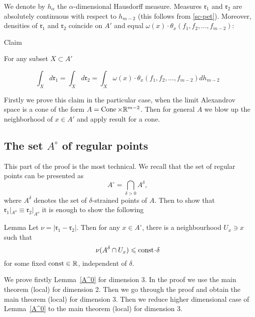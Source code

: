 We denote by $h_\alpha$ the $\alpha$-dimensional Hausdorff measure. Measures
$\mathfrak{r}_1$ and
$\mathfrak{r}_2$ are
 absolutely continuous with respect to
 $h_{m-2}$ (this follows from \ref{sc-pet}).
Moreover,
densities of
 $\mathfrak{r}_1$ and
$\mathfrak{r}_2$
coincide on $A'$ and equal 
$ \omega(x)\cdot\theta_x(f_1,f_2,\dots,f_{m-2})$:
\begin{thm}{Claim}\label{A'}
 
For any subset $X\subset A'$
 
 $$\int_Xd\mathfrak{r}_1=\int_Xd\mathfrak{r}_2=\int_X
\omega(x)\cdot\theta_x(f_1,f_2,\dots,f_{m-2}) d h_{m-2} $$
 
  
\end{thm}

Firstly we prove this claim in the particular case, when
the limit Alexandrov space is a cone of the form $A=\operatorname{Cone}\times\mathbb{R}^{m-2}$. Then for general $A$ we blow up the 
neighborhood of  $x\in A'$ and apply result for a cone.

\subsection{The set $A^\circ$  of regular points }\label{sec:A0}
This part of the proof is the most technical.
We recall that the set of regular points can be presented as
$$A^{\circ}=\bigcap_{\delta>0} A^\delta,$$
where $A^\delta$ denotes the set of $\delta$-strained points of $A$.
Then to show that
$\mathfrak{r}_1|_{A^o}\equiv\mathfrak{r}_2|_{A^o}$
it is enough to show the following

\begin{thm}{Lemma}\label{A^0}
Let $\nu=|\mathfrak{r}_1-\mathfrak{r}_2|$.
Then for any $x\in A^\circ$, there is a neighbourhood $U_x\ni x$ such that
$$\nu({A^\delta\cap U_x})\le \const\cdot\delta$$
for some fixed $\mathrm{const}\in\mathbb{R}$, independent of $\delta$.
\end{thm}


We prove firstly Lemma~\ref{A^0} for dimension 3. In the proof
we use the main theorem (local) for dimension 2. 
 Then we go through the proof and obtain the main theorem (local) for dimension 3.
 Then we reduce higher dimensional case of Lemma~\ref{A^0} to 
   the main theorem (local) for dimension 3. 
    
 
 
